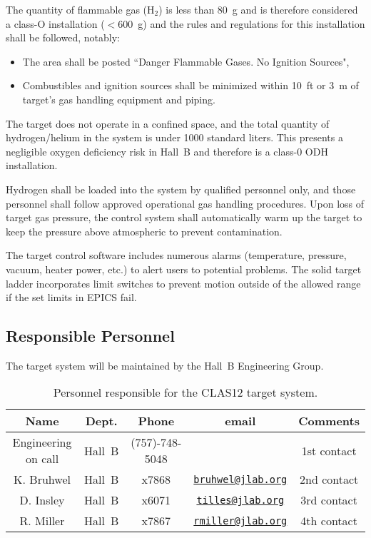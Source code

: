 The quantity of flammable gas (H$_2$) is less than 80~g and is therefore considered a class-O 
installation ($<$600~g) and the rules and regulations for this installation shall be followed, 
notably:

\begin{itemize}

\item The area shall be posted ``Danger Flammable Gases.  No Ignition Sources",

\item Combustibles and ignition sources shall be minimized within 10~ft or 3~m of target's gas 
handling equipment and piping.
\end{itemize}

The target does not operate in a confined space, and the total quantity of hydrogen/helium in 
the system is under 1000 standard liters. This presents a negligible oxygen deficiency risk in 
Hall~B and therefore is a class-0 ODH installation.

Hydrogen shall be loaded into the system by qualified personnel only, and those personnel shall 
follow approved operational gas handling procedures.   Upon loss of target gas pressure, the 
control system shall automatically warm up the target to keep the pressure above atmospheric to 
prevent contamination. 

The target control software includes numerous alarms (temperature, pressure, vacuum, heater 
power, etc.) to alert users to potential problems. The solid target ladder incorporates limit 
switches to prevent motion outside of the allowed range if the set limits in EPICS fail. 

\subsection{Responsible Personnel}

The target system will be maintained by the Hall~B Engineering Group.  

\begin{table}[!htb]
\centering
\begin{tabular}{|c|c|c|c|c|}
\hline
 Name&Dept.&Phone&email&Comments \\ \hline
Engineering on call & Hall~B&(757)-748-5048&& 1st contact  \\ \hline
K. Bruhwel& Hall~B&x7868&\href{mailto:bruhwel@jlab.org}{\nolinkurl{bruhwel@jlab.org}}&2nd contact \\ \hline
D. Insley & Hall~B&x6071&\href{mailto:tilles@jlab.org}{\nolinkurl{tilles@jlab.org}}  &3rd contact \\ \hline
R. Miller &Hall~B&x7867&\href{mailto:rmiller@jlab.org}{\nolinkurl{rmiller@jlab.org}} &4th contact \\ \hline
\end{tabular}
\caption{Personnel responsible for the CLAS12 target system.} 
\label{tb:target}
\end{table}
